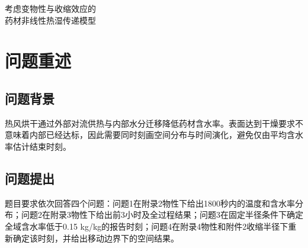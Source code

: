 \documentclass[UTF8,zihao=-4,a4paper]{ctexart}
\newcommand{\keywords}[1]{\par\noindent\textbf{关键词：}#1}
\begin{document}
\pagestyle{plain}\songti{}\sloppy
\begin{center}\titlefont{}考虑变物性与收缩效应的\\药材非线性热湿传递模型\end{center}

\begin{abstract}
药材热风干燥存在表面失水快、内部响应滞后及后期传质受限等现象，仅用平均含水率难以判断全域是否达标。针对圆柱形药材，本文以温度和干基含水率为状态，建立变物性径向热湿传递模型，并在收缩条件下采用归一化材料坐标统一描述计算域。

针对问题1，使用题给预热物性及环境观测构造对流边界，采用圆环有限体积法求解温湿分布。1800秒时中心与表面温度分别为33.5753和36.7856摄氏度，表面含水率降至1.5103千克/千克，中心仍接近初值，体现出明显的径向传递滞后。

针对问题2和问题3，将附录3经验物性纳入全程模型，以浓度区间积分计算非线性界面扩散系数，并通过表面加密网格和隐式迭代解析低含水率层。以全域最大含水率低于0.15千克/千克为判据，得到固定半径条件下的报告干燥时长为57.1696小时；同时给出前3小时代表性剖面以及全过程逐秒结果。

针对问题4，引入实测半径变化和附录4物性，得到报告干燥时长50.8244小时、终点半径1.2000厘米。采用当前物理半径重构固定距离结果，避免将域外空值误作零含水率。两问同时改变物性与几何，时长差不能全部归因于收缩。

通过容差收紧、独立离散程序对照及边界系数情景扫描检验实现。时间容差收紧后，两问报告终点差不超过0.0146秒；在给定离散情景内，传质系数扰动对时长的影响大于换热系数扰动。上述检验不替代物理标定：4小时后的环境延拓、有效气固浓度映射及潜热省略仍限制预测精度。模型可用于给定工况下的温湿分布分析与条件性干燥时间估算。

\keywords{圆柱径向扩散；变物性；区间积分通量；移动坐标；有限体积；全域达标}
\end{abstract}
\clearpage

\section{问题重述}
\subsection{问题背景}
热风烘干通过外部对流供热与内部水分迁移降低药材含水率。表面达到干燥要求不意味着内部已经达标，因此需要同时刻画空间分布与时间演化，避免仅由平均含水率估计结束时刻。
\subsection{问题提出}
题目要求依次回答四个问题：问题1在附录2物性下给出1800秒内的温度和含水率分布；问题2在附录3物性下给出前3小时及全过程结果；问题3在固定半径条件下确定全域含水率低于0.15 kg/kg的报告时刻；问题4在附录4物性和附件2收缩半径下重新确定该时刻，并给出移动边界下的空间结果。
\end{document}
